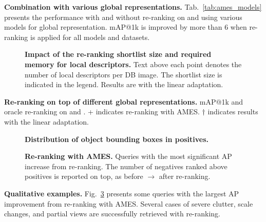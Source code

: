 \noindent\textbf{Combination with various global representations.}
Tab.~\ref{tab:ames_models} presents the performance with and without re-ranking on \ours and \miniours using various models for global representation. mAP@1k is improved by more than 6 when re-ranking is applied for all models and datasets.

\begin{figure}[t]
    \centering
    
    \vspace{-7pt}
    \caption{\textbf{Impact of the re-ranking shortlist size and required memory for local descriptors.} Text above each point denotes the number of local descriptors per DB image. The shortlist size is indicated in the legend. Results are with the linear adaptation.
    \label{fig:ames_num_desc}
    \vspace{-7pt}
    }
\end{figure}

\begin{table}[t]

  \centering
  
  \vspace{-7pt}
  \caption{\textbf{Re-ranking on top of different global representations.} mAP@1k and oracle re-ranking on \ours and \miniours. + indicates re-ranking with AMES. $\dagger$ indicates results with the linear adaptation.
  \label{tab:ames_models}
  \vspace{-7pt}
  }
\end{table}

\begin{figure}[t]
  \centering
  \scalebox{0.55}{
    
  }
  \caption{\textbf{Distribution of object bounding boxes in positives.}
  \label{fig:heatmap_spatial_location}
  \vspace{-10pt}
  }
\end{figure}

\begin{figure}[t]
  \centering
  \vspace{10pt}
  
  \vspace{-15pt}
  \caption{\textbf{Re-ranking with AMES.} Queries with the most significant AP increase from re-ranking. The number of negatives ranked above positives is reported on top, as before $\rightarrow$ after re-ranking.
  \label{fig:ames_rerank}
  }
\end{figure}

\noindent\textbf{Qualitative examples.} Fig.~\ref{fig:ames_rerank} presents some queries with the largest AP improvement from re-ranking with AMES. Several cases of severe clutter, scale changes, and partial views are successfully retrieved with re-ranking.





